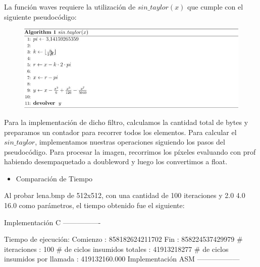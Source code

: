 \documentclass[10pt, a4paper]{article}
\begin{document}
\begin{itemize}
La función waves requiere la utilización de $sin\_taylor(x)$ que cumple con el siguiente pseudocódigo:
\begin{figure}[H] %
\begin{center}
\includegraphics[width=400pt]{./algoritmo_waves.jpg}
\end{center}
\end{figure}
Para la implementación de dicho filtro, calculamos la cantidad total de bytes y preparamos un contador para recorrer todos los elementos. Para calcular el $sin\_taylor$, implementamos nuestras operaciones siguiendo los pasos del pseudocódigo.\newline
Para procesar la imagen, recorrimos los píxeles evaluando con prof habiendo desempaquetado a doubleword y luego los convertimos a float.   
\begin{itemize}
\item{Comparación de Tiempo}
\end{itemize}
Al probar lena.bmp de 512x512, con una cantidad de 100 iteraciones y 2.0 4.0 16.0 como parámetros, el tiempo obtenido fue el siguiente:\newline

Implementación C\newline
----------------

Tiempo de ejecución:\newline
  Comienzo                          : 858182624211702\newline
  Fin                               : 858224537429979\newline
  \# iteraciones                     : 100\newline
  \# de ciclos insumidos totales     : 41913218277\newline
  \# de ciclos insumidos por llamada : 419132160.000\newline
\newline
Implementación ASM\newline
------------------


\end{itemize}
\end{document}
